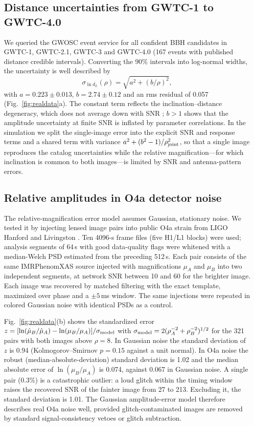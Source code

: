 \subsection{Distance uncertainties from GWTC-1 to GWTC-4.0}
We queried the GWOSC event service \citep{gwosc2023} for all confident BBH candidates in GWTC-1, GWTC-2.1, GWTC-3 and GWTC-4.0 (167 events with published distance credible intervals). Converting the 90\% intervals into log-normal widths, the uncertainty is well described by
\begin{equation}
\sigma_{\ln d_L}(\rho)=\sqrt{a^2+(b/\rho)^2},
\end{equation}
with $a=0.223\pm0.013$, $b=2.74\pm0.12$ and an rms residual of 0.057 (Fig.~\ref{fig:realdata}a). The constant term reflects the inclination--distance degeneracy, which does not average down with SNR \citep{cutler1994gravitational}; $b>1$ shows that the amplitude uncertainty at finite SNR is inflated by parameter correlations. In the simulation we split the single-image error into the explicit SNR and response terms and a shared term with variance $a^2+(b^2-1)/\rho_{\rm joint}^2$, so that a single image reproduces the catalog uncertainties while the relative magnification---for which inclination is common to both images---is limited by SNR and antenna-pattern errors.

\subsection{Relative amplitudes in O4a detector noise}
The relative-magnification error model assumes Gaussian, stationary noise. We tested it by injecting lensed image pairs into public O4a strain from LIGO Hanford and Livingston \citep{gwosc2023}. Ten 4096-s frame files (five H1/L1 blocks) were used; analysis segments of 64\,s with good data-quality flags were whitened with a median-Welch PSD estimated from the preceding 512\,s. Each pair consists of the same IMRPhenomXAS source injected with magnifications $\mu_A$ and $\mu_B$ into two independent segments, at network SNR between 10 and 60 for the brighter image. Each image was recovered by matched filtering with the exact template, maximized over phase and a $\pm5$\,ms window. The same injections were repeated in colored Gaussian noise with identical PSDs as a control.

Fig.~\ref{fig:realdata}(b) shows the standardized error $z=[\ln(\hat\mu_B/\hat\mu_A)-\ln(\mu_B/\mu_A)]/\sigma_{\rm model}$ with $\sigma_{\rm model}=2(\rho_A^{-2}+\rho_B^{-2})^{1/2}$ for the 321 pairs with both images above $\rho=8$. In Gaussian noise the standard deviation of $z$ is 0.94 (Kolmogorov--Smirnov $p=0.15$ against a unit normal). In O4a noise the robust (median-absolute-deviation) standard deviation is 1.02 and the median absolute error of $\ln(\mu_B/\mu_A)$ is 0.074, against 0.067 in Gaussian noise. A single pair (0.3\%) is a catastrophic outlier: a loud glitch within the timing window raises the recovered SNR of the fainter image from 27 to 213. Excluding it, the standard deviation is 1.01. The Gaussian amplitude-error model therefore describes real O4a noise well, provided glitch-contaminated images are removed by standard signal-consistency vetoes or glitch subtraction.

